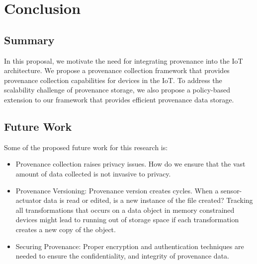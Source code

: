 
\chapter{Conclusion}

\section{Summary}
In this proposal, we motivate the need for integrating provenance into the IoT architecture. We propose a provenance collection framework that provides provenance collection capabilities for devices in the IoT. To address the scalability challenge of provenance storage, we also propose a  policy-based extension to our framework that provides efficient provenance data storage.

\section{Future Work}

Some of the proposed future work for this research is:
\begin{itemize}

\item Provenance collection raises privacy issues. How do we ensure that the vast amount of data collected is not invasive to privacy.

\item Provenance Versioning: Provenance version creates cycles. When a sensor-actuator data is read or edited, is a new instance of the file created? Tracking all transformations that occurs on a data object in memory constrained devices might lead to running out of storage space if each transformation creates a new copy of the object.

\item Securing Provenance: Proper encryption and authentication techniques \cite{Hasan:2009:CFP:1525908.1525909} are needed to ensure the confidentiality, and integrity of provenance data.

\end{itemize}

